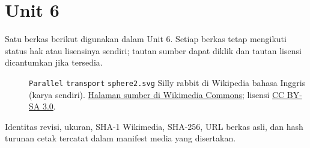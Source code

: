 \section*{Unit 6}
Satu berkas berikut digunakan dalam Unit 6. Setiap berkas tetap mengikuti status hak atau lisensinya sendiri; tautan sumber dapat diklik dan tautan lisensi dicantumkan jika tersedia.
\begin{description}
\item[]\texttt{Parallel} \texttt{transport} \texttt{sphere2.svg}
Silly rabbit di Wikipedia bahasa Inggris (karya sendiri).
\href{https://commons.wikimedia.org/wiki/File:Parallel_transport_sphere2.svg}{Halaman sumber di Wikimedia Commons}; lisensi \href{https://creativecommons.org/licenses/by-sa/3.0/}{CC BY-SA 3.0}.
\end{description}
Identitas revisi, ukuran, SHA-1 Wikimedia, SHA-256, URL berkas asli, dan hash turunan cetak tercatat dalam manifest media yang disertakan.
